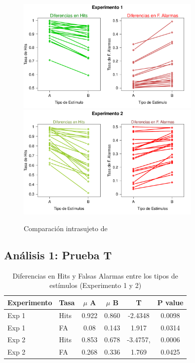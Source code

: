 \begin{figure}[th]
\centering
\includegraphics[width=0.80\textwidth]{Figures/Diff_Rate_E1}\\ 
\includegraphics[width=0.80\textwidth]{Figures/Diff_Rate_E2}
\caption[Diferencias en Tasas (Evaluando diferencias en el desempeño entre las condiciones)]{Comparación intrasujeto de}
\label{fig:Diff_Rate}
\end{figure}


\subsection{Análisis 1: Prueba T}



\begin{table}
\caption[Prueba T para evaluar diferencias en las medias de las tasas de ejecución (Hits y F. Alarmas) entre condiciones]{Diferencias en Hits y Falsas Alarmas entre los tipos de estímulos (Experimento 1 y 2)}
\label{Tabla_t-HitsyFA}
\centering
\begin{tabular}{l l | c c c c}
\toprule
\textbf{Experimento} & \textbf{Tasa} & \textbf{$\mu$ A} & \textbf{$\mu$ B} & \textbf{T} & \textbf{P value}\\
\midrule
Exp 1 & Hits & 0.922 & 0.860 & -2.4348 & 0.0098 \\
Exp 1 & FA & 0.08 & 0.143 & 1.917 & 0.0314 \\
Exp 2 & Hits & 0.853 & 0.678 & -3.4757, & 0.0006 \\
Exp 2 & FA & 0.268 & 0.336 & 1.769 & 0.0425 \\
\bottomrule
\end{tabular}
\end{table}


